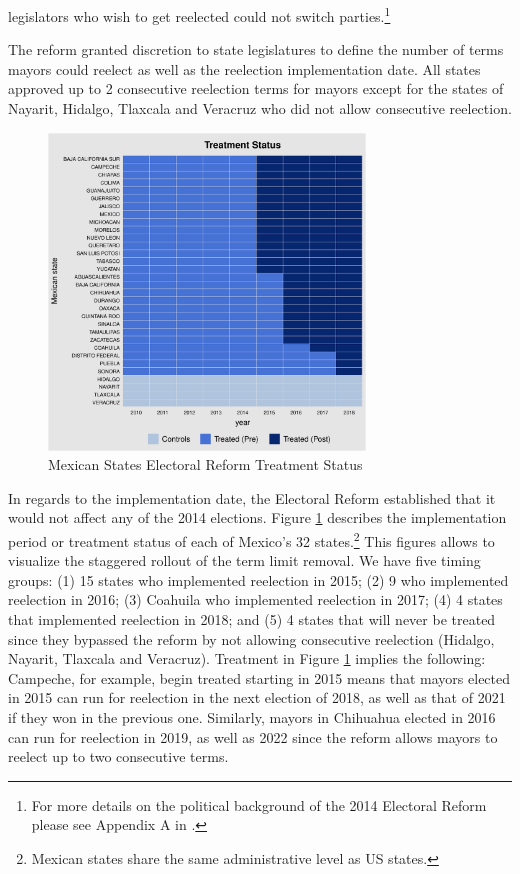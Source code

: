 legislators who wish to get reelected could not switch parties.\footnote{For more details on the political background of the 2014 Electoral Reform please see Appendix A in \citet{ch_2021}.}

The reform granted discretion to state legislatures to define the number of terms mayors could reelect as well as the reelection implementation date. All states approved up to 2 consecutive reelection terms for mayors except for the states of Nayarit, Hidalgo, Tlaxcala and Veracruz who did not allow consecutive reelection. 

\begin{figure}[H]   
\centering 
\caption{Mexican States Electoral Reform Treatment Status}
\label{fig:treatment_status}
\includegraphics[width=0.75\textwidth]{Chapter2/Figures_incumbency/reform_treatmentstatus.pdf}     
\captionsetup{justification=centering} 
\end{figure}     
  
  
In regards to the implementation date, the Electoral Reform established that it would not affect any of the 2014 elections. Figure \ref{fig:treatment_status} describes the implementation period or treatment status of each of Mexico's 32 states.\footnote{Mexican states share the same administrative level as US states.} This figures allows to visualize the staggered rollout of the term limit removal. We have five timing groups: (1) 15 states who implemented reelection in 2015; (2) 9 who implemented reelection in 2016; (3) Coahuila who implemented reelection in 2017; (4) 4 states that implemented reelection in 2018; and (5) 4 states that will never be treated since they bypassed the reform by not allowing consecutive reelection (Hidalgo, Nayarit, Tlaxcala and Veracruz). Treatment in Figure \ref{fig:treatment_status} implies the following: Campeche, for example, begin treated starting in 2015 means that mayors elected in 2015 can run for reelection in the next election of 2018, as well as that of 2021 if they won in the previous one. Similarly, mayors in Chihuahua elected in 2016 can run for reelection in 2019, as well as 2022 since the reform allows mayors to reelect up to two consecutive terms. 

